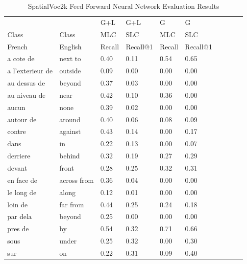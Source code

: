 \documentclass{IEEEtran}
\begin{document}
\begin{table}[!htbp]
\caption{SpatialVoc2k Feed Forward Neural Network Evaluation Results}
\centering
\begin{tabular}{|l|l|l|l|l|l|l|l|l|l}
\cline{1-6}
	  			  & 	  			  & G+L 		& G+L      & G  	  & G   	  \\ \cline{1-6}
Class 			  &  Class 			  & MLC   		& SLC  	   & MLC      & SLC       \\ \cline{1-6}
French            & English           & Recall      & Recall@1 &  Recall  & Recall@1  \\ \cline{1-6}
a cote de	      &	next to           &	0.40		&   0.11   &	0.54  &	0.65     \\ \cline{1-6}
a l'exterieur de  &	outside	          &	0.09		&	0.00   &	0.00  &	0.00	  \\ \cline{1-6}
au dessus de	  &	beyond		      &	0.37		&	0.03   &	0.00  &	0.00	  \\ \cline{1-6}
au niveau de	  &	near		      &	0.42	    &	0.10   &	0.36  &	0.00	  \\ \cline{1-6}
aucun	          &	none		  	  &	0.39		&	0.02   &	0.00  &	0.00	  \\ \cline{1-6} 
autour de	      &	around		      &	0.40		&	0.06   &	0.08  &	0.09	  \\ \cline{1-6}
contre			  &	against		      &	0.43	    &	0.14   &	0.00  &	0.17	  \\ \cline{1-6}
dans			  &	in				  &	0.22     	&	0.13   &	0.00  &	0.07  	  \\ \cline{1-6}
derriere		  &	behind		      &	0.32		&	0.19   &	0.27  &	0.29      \\ \cline{1-6}
devant			  &	front		      &	0.28		&	0.25   &	0.32  &	0.31      \\ \cline{1-6} 
en face de		  & across from		  &	0.36		&	0.04   &	0.00  &	0.00	  \\ \cline{1-6} 
le long de	      &	along		      &	0.12		&	0.01   &	0.00  &	0.00 	  \\ \cline{1-6} 
loin de			  &	far from		  &	0.44		&	0.25   &	0.24  &	0.18	  \\ \cline{1-6}
par dela	      &	beyond	          &	0.25	    &	0.00   &	0.00  &	0.00      \\ \cline{1-6}
pres de			  &	by		          &	0.54		&	0.32   &	0.71  &	0.66	  \\ \cline{1-6}
sous		   	  &	under	          &	0.25	    &	0.32   &	0.00  &	0.30	  \\ \cline{1-6}
sur				  &	on			      &	0.22	    &	0.31   &	0.09  &	0.40	  \\ \cline{1-6}

\end{tabular}
\end{table}
\end{document}

